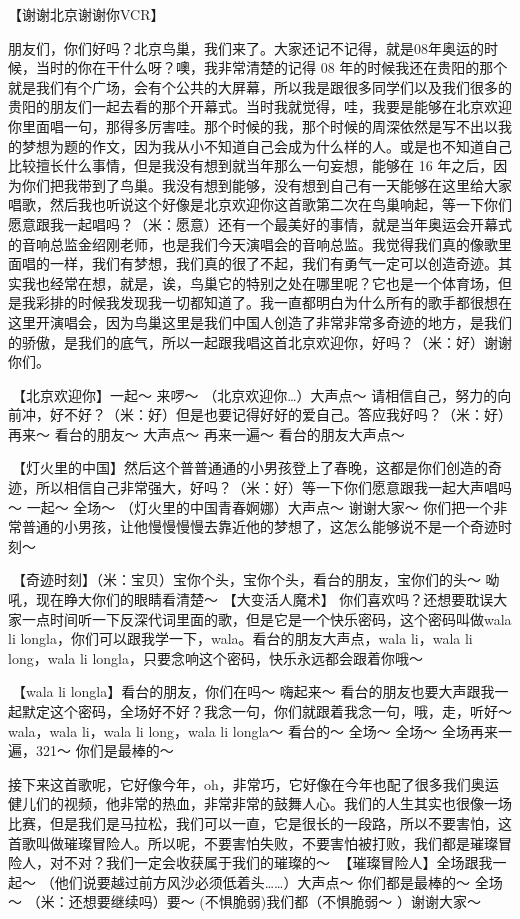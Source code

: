 \documentclass[
]{book}
\begin{document}
【谢谢北京谢谢你VCR】

朋友们，你们好吗？北京鸟巢，我们来了。大家还记不记得，就是08年奥运的时候，当时的你在干什么呀？噢，我非常清楚的记得 08 年的时候我还在贵阳的那个就是我们有个广场，会有个公共的大屏幕，所以我是跟很多同学们以及我们很多的贵阳的朋友们一起去看的那个开幕式。当时我就觉得，哇，我要是能够在北京欢迎你里面唱一句，那得多厉害哇。那个时候的我，那个时候的周深依然是写不出以我的梦想为题的作文，因为我从小不知道自己会成为什么样的人。或是也不知道自己比较擅长什么事情，但是我没有想到就当年那么一句妄想，能够在 16 年之后，因为你们把我带到了鸟巢。我没有想到能够，没有想到自己有一天能够在这里给大家唱歌，然后我也听说这个好像是北京欢迎你这首歌第二次在鸟巢响起，等一下你们愿意跟我一起唱吗？（米：愿意）还有一个最美好的事情，就是当年奥运会开幕式的音响总监金绍刚老师，也是我们今天演唱会的音响总监。我觉得我们真的像歌里面唱的一样，我们有梦想，我们真的很了不起，我们有勇气一定可以创造奇迹。其实我也经常在想，就是，诶，鸟巢它的特别之处在哪里呢？它也是一个体育场，但是我彩排的时候我发现我一切都知道了。我一直都明白为什么所有的歌手都很想在这里开演唱会，因为鸟巢这里是我们中国人创造了非常非常多奇迹的地方，是我们的骄傲，是我们的底气，所以一起跟我唱这首北京欢迎你，好吗？（米：好）谢谢你们。

🎵【北京欢迎你】一起～ 来啰～ （北京欢迎你\ldots）大声点～ 请相信自己，努力的向前冲，好不好？（米：好）但是也要记得好好的爱自己。答应我好吗？（米：好）再来～ 看台的朋友～ 大声点～ 再来一遍～ 看台的朋友大声点～

🎵【灯火里的中国】然后这个普普通通的小男孩登上了春晚，这都是你们创造的奇迹，所以相信自己非常强大，好吗？（米：好）等一下你们愿意跟我一起大声唱吗～ 一起～ 全场～ （灯火里的中国青春婀娜）大声点～ 谢谢大家～
你们把一个非常普通的小男孩，让他慢慢慢慢去靠近他的梦想了，这怎么能够说不是一个奇迹时刻～

🎵【奇迹时刻】（米：宝贝）宝你个头，宝你个头，看台的朋友，宝你们的头～ 呦吼，现在睁大你们的眼睛看清楚～ 【大变活人魔术】
你们喜欢吗？还想要耽误大家一点时间听一下反深代词里面的歌，但是它是一个快乐密码，这个密码叫做wala li longla，你们可以跟我学一下，wala。看台的朋友大声点，wala li，wala li long，wala li longla，只要念响这个密码，快乐永远都会跟着你哦～

🎵【wala li longla】看台的朋友，你们在吗～ 嗨起来～ 看台的朋友也要大声跟我一起默定这个密码，全场好不好？我念一句，你们就跟着我念一句，哦，走，听好～ wala，wala li，wala li long，wala li longla～ 看台的～ 全场～ 全场～ 全场再来一遍，321～ 你们是最棒的～

接下来这首歌呢，它好像今年，oh，非常巧，它好像在今年也配了很多我们奥运健儿们的视频，他非常的热血，非常非常的鼓舞人心。我们的人生其实也很像一场比赛，但是我们是马拉松，我们可以一直，它是很长的一段路，所以不要害怕，这首歌叫做璀璨冒险人。所以呢，不要害怕失败，不要害怕被打败，我们都是璀璨冒险人，对不对？我们一定会收获属于我们的璀璨的～
🎵【璀璨冒险人】全场跟我一起～ （他们说要越过前方风沙必须低着头\ldots\ldots）大声点～ 你们都是最棒的～ 全场～ （米：还想要继续吗）要～ (不惧脆弱)我们都（不惧脆弱～ ）谢谢大家～
\end{document}

